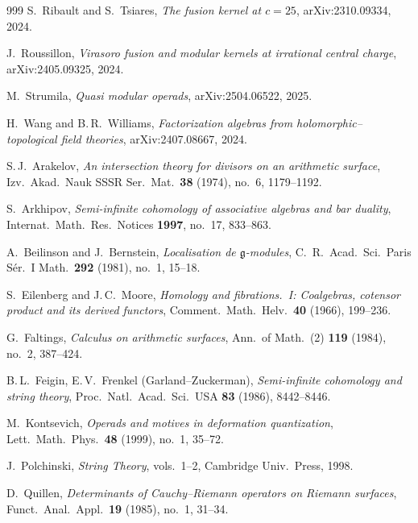 \documentclass[11pt]{memoir}
\begin{document}
\begin{thebibliography}{999}
S.~Ribault and S.~Tsiares, \emph{The fusion kernel at $c=25$}, arXiv:2310.09334, 2024.

J.~Roussillon, \emph{Virasoro fusion and modular kernels at irrational central charge}, arXiv:2405.09325, 2024.

M.~Strumila, \emph{Quasi modular operads}, arXiv:2504.06522, 2025.

H.~Wang and B.\,R.~Williams, \emph{Factorization algebras from holomorphic--topological field theories}, arXiv:2407.08667, 2024.


S.\,J.~Arakelov, \emph{An intersection theory for divisors on an arithmetic surface}, Izv.\ Akad.\ Nauk SSSR Ser.\ Mat.\ \textbf{38} (1974), no.~6, 1179--1192.

S.~Arkhipov, \emph{Semi-infinite cohomology of associative algebras and bar duality}, Internat.\ Math.\ Res.\ Notices \textbf{1997}, no.~17, 833--863.

A.~Beilinson and J.~Bernstein, \emph{Localisation de $\mathfrak{g}$-modules}, C.~R.\ Acad.\ Sci.\ Paris S\'er.~I Math.\ \textbf{292} (1981), no.~1, 15--18.

S.~Eilenberg and J.\,C.~Moore, \emph{Homology and fibrations.~I: Coalgebras, cotensor product and its derived functors}, Comment.\ Math.\ Helv.\ \textbf{40} (1966), 199--236.

G.~Faltings, \emph{Calculus on arithmetic surfaces}, Ann.\ of Math.\ (2) \textbf{119} (1984), no.~2, 387--424.

B.\,L.~Feigin, E.\,V.~Frenkel (Garland--Zuckerman), \emph{Semi-infinite cohomology and string theory}, Proc.\ Natl.\ Acad.\ Sci.\ USA \textbf{83} (1986), 8442--8446.

M.~Kontsevich, \emph{Operads and motives in deformation quantization}, Lett.\ Math.\ Phys.\ \textbf{48} (1999), no.~1, 35--72.

J.~Polchinski, \emph{String Theory}, vols.~1--2, Cambridge Univ.\ Press, 1998.

D.~Quillen, \emph{Determinants of Cauchy--Riemann operators on Riemann surfaces}, Funct.\ Anal.\ Appl.\ \textbf{19} (1985), no.~1, 31--34.


\end{thebibliography}
\end{document}
